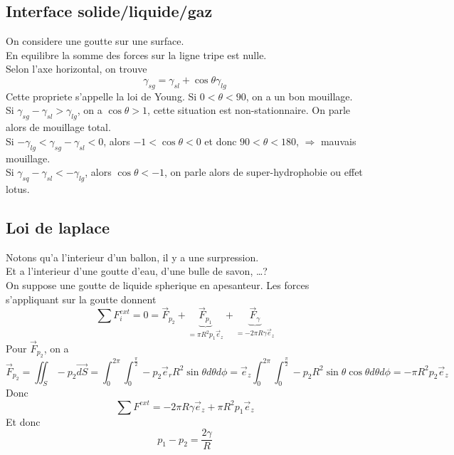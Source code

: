 \documentclass[../main.tex]{subfiles}
\begin{document}
\subsection{Interface solide/liquide/gaz}
On considere une goutte sur une surface.\\
En equilibre la somme des forces sur la ligne tripe est nulle.\\
Selon l'axe horizontal, on trouve
\[ 
\gamma_{sg} = \gamma_{sl} + \cos\theta \gamma_{lg} 
\]
Cette propriete s'appelle la loi de Young.
Si $0<\theta < 90$, on a un bon mouillage.\\
Si $\gamma_{sg} -\gamma_{sl} >\gamma_{lg}$, on a $\cos \theta >1$, cette situation est non-stationnaire.
On parle alors de mouillage total.\\
Si $-\gamma_{lg} < \gamma_{sg} -\gamma_{sl} <0$, alors $-1< \cos\theta <0$ et donc $90<\theta <180$, $\Rightarrow$ mauvais mouillage.\\
Si $\gamma_{sq} - \gamma_{sl} < -\gamma_{lg} $, alors $\cos \theta <-1$, on parle alors de super-hydrophobie ou effet lotus.
\subsection{Loi de laplace}
Notons qu'a l'interieur d'un ballon, il y a une surpression.\\
Et a l'interieur d'une goutte d'eau, d'une bulle de savon, \ldots ?\\
On suppose une goutte de liquide spherique en apesanteur.
Les forces s'appliquant sur la goutte donnent
\[ 
\sum F_i^{ext}= 0 = \vec{F}_{p_2} + \underbrace{\vec{F}_{p_1}}_{= \pi R^{2}p_1 \vec{e}_z} + \underbrace{\vec{F}_{\gamma}}_{=-2\pi R \gamma \vec{e}_z} 
\]
Pour $\vec{F}_{p_2} $, on a 
\[
	\vec{F}_{p_2} = \iint_S - p_2 \vec{dS} = \int_{ 0 }^{ 2\pi } \int_{ 0 }^{ \frac{\pi}{2} }- p_2 \vec{e}_r R^{2} \sin\theta d \theta d\phi = \vec{e}_z \int_{ 0 }^{ 2\pi } \int_{ 0 }^{ \frac{\pi}{2} }- p_2 R^{2} \sin \theta \cos \theta d\theta d \phi = - \pi R^{2}p_{2} \vec{e}_z
\]
Donc
\[ 
	\sum F^{ext}= - 2 \pi R \gamma \vec{e}_z + \pi R^{2}p_1 \vec{e}_z
\]
Et donc
\[ 
p_1 - p_2 = \frac{2\gamma}{R}
\]
\end{document}
